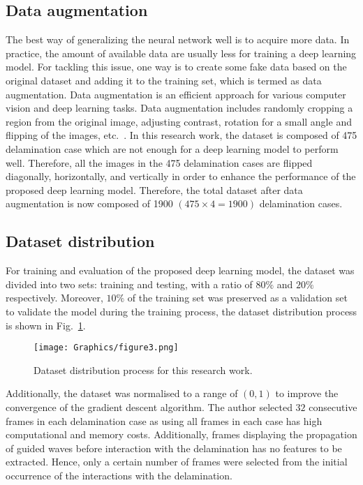 \subsection{Data augmentation}
The best way of generalizing the neural network well is to acquire more data. 
In practice, the amount of available data are usually less for training a deep 
learning model. 
For tackling this issue, one way is to create some fake data based on the 
original dataset and adding it to the training set, which is termed as data 
augmentation. 
Data augmentation is an efficient approach for various computer vision and deep 
learning tasks. 
Data augmentation includes randomly cropping a region from the original image, 
adjusting contrast, rotation for a small angle and flipping of the images, 
etc.~\cite{szegedy2015going}.
In this research work, the dataset is composed of 475 delamination case which 
are not enough for a deep learning model to perform well.
Therefore, all the images in the 475 delamination cases are flipped diagonally, 
horizontally, and vertically in order to enhance the performance of the 
proposed deep learning model. 
Therefore, the total dataset after data augmentation is now composed of 1900 
\((475\times4 = 1900)\) delamination cases.
\subsection{Dataset distribution}
For training and evaluation of the proposed deep learning model, the dataset 
was divided into two sets: training and testing, with 
a ratio of \(80\%\) and \(20\% \) respectively.
Moreover, \(10\%\) of the training set was preserved as a validation 
set to validate the model during the training process, the dataset distribution 
process is shown in Fig.~\ref{fig:data_distribution}.
\begin{figure} [h!]
	\begin{center}
		\texttt{[image: Graphics/figure3.png]}
	\end{center}
	\caption{Dataset distribution process for this research work.} 
	\label{fig:data_distribution}
\end{figure}
Additionally, the dataset was normalised to a range of \((0, 1)\) to improve 
the convergence of the gradient descent algorithm.
The author selected \(32\) consecutive frames in each delamination case as 
using all frames in each case has high computational and memory 
costs.
Additionally, frames displaying the propagation of guided waves before 
interaction with the delamination has no features to be extracted.
Hence, only a certain number of frames were selected from the initial 
occurrence of the interactions with the delamination.
